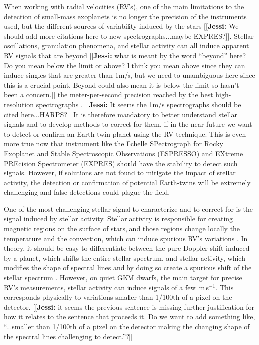 \documentclass[11pt, oneside]{article}
\def\ms{\hbox{\,m\,s$^{-1}$}}         %
\newcommand{\jessi}[1]{{\color{Purple}[[\textbf{Jessi: }#1]]}}
\begin{document}
When working with radial velocities (RV's), one of the main limitations to the detection of small-mass exoplanets is no longer the precision of the instruments used, but the different sources of variability induced by the stars \citep[][]{Dumusque:2017aa} \jessi{We should add more citations here to new spectrographs...maybe EXPRES?}. 
Stellar oscillations, granulation phenomena, and stellar activity can all induce apparent RV signals \citep{Saar-1997b, Queloz-2001, Desort-2007, Dumusque-2011a, Dumusque-2016a} that are beyond \jessi{what is meant by the word ``beyond'' here? Do you mean below the limit or above?  I think you mean above since they can induce singles that are greater than 1m/s, but we need to unambiguous here since this is a crucial point.  Beyond could also mean it is below the limit so hasn't been a concern.} the meter-per-second precision reached by the best high-resolution spectrographs \citep{fischer2016state}. \jessi{It seems the 1m/s spectrographs should be cited here...HARPS?}
%
It is therefore mandatory to better understand stellar signals and to develop methods to correct for them, if in the near future we want to detect or confirm an Earth-twin planet using the RV technique. This is even more true now that instrument like the Echelle SPectrograph for Rocky Exoplanet and Stable Spectroscopic Observations (ESPRESSO) \citep{Pepe-2014} and EXtreme PREcision Spectrometer (EXPRES) \citep{fischer2016state} should have the stability to detect such signals. However, if solutions are not found to mitigate the impact of stellar activity, the detection or confirmation of potential Earth-twins will be extremely challenging and false detections could plague the field.


One of the most challenging stellar signal to characterize and to correct for is the signal induced by stellar activity. 
Stellar activity is responsible for creating magnetic regions on the surface of stars, and those regions change locally the temperature and the convection, which can induce spurious RV's variations \citep{Meunier-2010a, Dumusque-2014b}. 
In theory, it should be easy to differentiate between the pure Doppler-shift induced by a planet, which shifts the entire stellar spectrum, and stellar activity, which modifies the shape of spectral lines and by doing so create a spurious shift of the stellar spectrum \citep{Saar-1997b,Hatzes-2002,Kurster2003,Lindegren-2003,Desort-2007,Lagrange-2010,Meunier-2010a,Dumusque-2014b}. 
However, on quiet GKM dwarfs, the main target for precise RV's measurements, stellar activity can induce signals of a few \ms. This corresponds physically to variations smaller than 1/100th of a pixel on the detector. \jessi{it seems the previous sentence is missing further justification for how it relates to the sentence that proceeds it.  Do we want to add something like, ``...smaller than 1/100th of a pixel on the detector making the changing shape of the spectral lines challenging to detect.''?}
\end{document}
